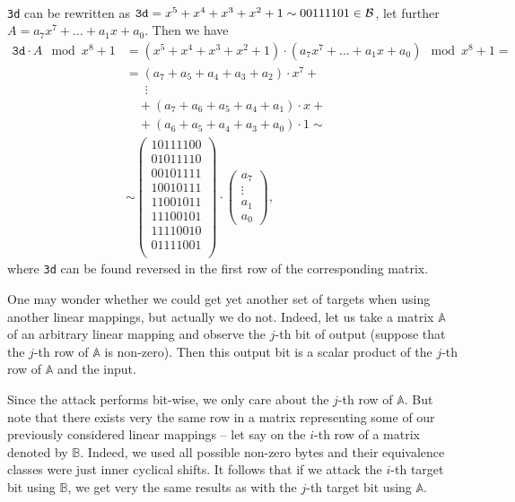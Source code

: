 \begin{example}
\label{ex:shiftmatrix}
	~ \\
	{\tt 3d} can be rewritten as $\texttt{3d} = x^5+x^4+x^3+x^2+1 \sim 00111101 \in\cal B$, let further $A = a_7x^7+\ldots+a_1x+a_0$. Then we have
	\begin{align*}
		\texttt{3d} \cdot A \mod{x^8+1} &= (x^5+x^4+x^3+x^2+1) \cdot (a_7x^7+\ldots+a_1x+a_0) \mod{x^8+1} = \\
		&= (a_7+a_5+a_4+a_3+a_2)\cdot x^7 + ~\\
		&\;\;\quad\vdots \\
		&\quad + (a_7+a_6+a_5+a_4+a_1)\cdot x + ~\\
		&\quad + (a_6+a_5+a_4+a_3+a_0)\cdot 1 \sim \\
		&\sim
		\begin{pmatrix}
			\boxed{10111100} \\
			01011110 \\
			00101111 \\
			10010111 \\
			11001011 \\
			11100101 \\
			11110010 \\
			01111001 \\
		\end{pmatrix}
		\cdot
		\begin{pmatrix}
			a_7 \\ \vdots \\ a_1 \\ a_0
		\end{pmatrix} ,
	\end{align*}
	where {\tt 3d} can be found reversed in the first row of the corresponding matrix.
\end{example}

One may wonder whether we could get yet another set of targets when using another linear mappings, but actually we do not. Indeed, let us take a matrix $\mathbb{A}$ of an arbitrary linear mapping and observe the $j$-th bit of output (suppose that the $j$-th row of $\mathbb{A}$ is non-zero). Then this output bit is a scalar product of the $j$-th row of $\mathbb{A}$ and the input.

Since the attack performs bit-wise, we only care about the $j$-th row of $\mathbb{A}$. But note that there exists very the same row in a matrix representing some of our previously considered linear mappings -- let say on the $i$-th row of a matrix denoted by $\mathbb{B}$. Indeed, we used all possible non-zero bytes and their equivalence classes were just inner cyclical shifts. It follows that if we attack the $i$-th target bit using $\mathbb{B}$, we get very the same results as with the $j$-th target bit using $\mathbb{A}$.

